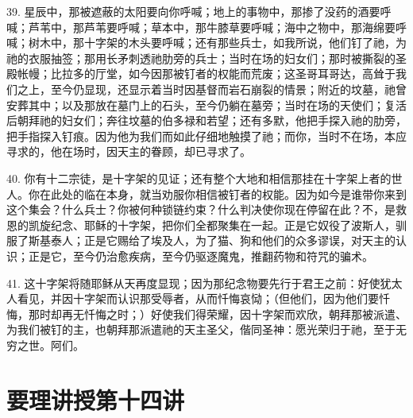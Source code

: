 39. 星辰中，那被遮蔽的太阳要向你呼喊；地上的事物中，那掺了没药的酒要呼喊；芦苇中，那芦苇要呼喊；草本中，那牛膝草要呼喊；海中之物中，那海绵要呼喊；树木中，那十字架的木头要呼喊；还有那些兵士，如我所说，他们钉了祂，为祂的衣服抽签；那用长矛刺透祂肋旁的兵士；当时在场的妇女们；那时被撕裂的圣殿帐幔；比拉多的厅堂，如今因那被钉者的权能而荒废；这圣哥耳哥达，高耸于我们之上，至今仍显现，还显示着当时因基督而岩石崩裂的情景；附近的坟墓，祂曾安葬其中；以及那放在墓门上的石头，至今仍躺在墓旁；当时在场的天使们；复活后朝拜祂的妇女们；奔往坟墓的伯多禄和若望；还有多默，他把手探入祂的肋旁，把手指探入钉痕。因为他为我们而如此仔细地触摸了祂；而你，当时不在场，本应寻求的，他在场时，因天主的眷顾，却已寻求了。\par

40. 你有十二宗徒，是十字架的见证；还有整个大地和相信那挂在十字架上者的世人。你在此处的临在本身，就当劝服你相信被钉者的权能。因为如今是谁带你来到这个集会？什么兵士？你被何种锁链约束？什么判决使你现在停留在此？不，是救恩的凯旋纪念、耶稣的十字架，把你们全都聚集在一起。正是它奴役了波斯人，驯服了斯基泰人；正是它赐给了埃及人，为了猫、狗和他们的众多谬误，对天主的认识；正是它，至今仍治愈疾病，至今仍驱逐魔鬼，推翻药物和符咒的骗术。\par

41. 这十字架将随耶稣从天再度显现；因为那纪念物要先行于君王之前：好使犹太人看见，并因十字架而认识那受辱者，从而忏悔哀恸；（但他们，因为他们要忏悔，那时却再无忏悔之时；）好使我们得荣耀，因十字架而欢欣，朝拜那被派遣、为我们被钉的主，也朝拜那派遣祂的天主圣父，偕同圣神：愿光荣归于祂，至于无穷之世。阿们。\par



\section{要理讲授第十四讲}

\par

\par

